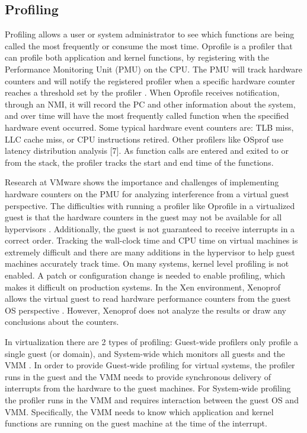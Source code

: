 \subsection{Profiling}
Profiling allows a user or system administrator to see which functions are being called the most frequently or consume the most time.  Oprofile \cite{levon} is a profiler that can profile both application and kernel functions, by registering with the Performance Monitoring Unit (PMU) on the CPU.  The PMU will track hardware counters and will notify the registered profiler when a specific hardware counter reaches a threshold set by the profiler \cite{mucci}.  When Oprofile receives notification, through an NMI, it will record the PC and other information about the system, and over time will have the most frequently called function when the specified hardware event occurred.  Some typical hardware event counters are:  TLB miss, LLC cache miss, or CPU instructions retired.   Other profilers like OSprof use latency distribution analysis [7].  As function calls are entered and exited to or from the stack, the profiler tracks the start and end time of the functions.

Research at VMware \cite{serebrin} shows the importance and challenges of implementing hardware counters on the PMU for analyzing interference from a virtual guest perspective.
The difficulties with running a profiler like Oprofile in a virtualized guest is that the hardware counters in the guest may not be available for all hypervisors \cite{buell1}.  Additionally, the guest is not guaranteed to receive interrupts in a correct order.   Tracking the wall-clock time and CPU time on virtual machines is extremely difficult and there are many additions in the hypervisor to help guest machines accurately track time.  On many systems, kernel level profiling is not enabled. A patch or configuration change is needed to enable profiling, which makes it difficult on production systems.
In the Xen environment, Xenoprof allows the virtual guest to read hardware performance counters from the guest OS perspective \cite{menon, du2}.  However, Xenoprof does not analyze the results or draw any conclusions about the counters.  

\indent In virtualization there are 2 types of profiling:  Guest-wide profilers only profile a single guest (or domain), and System-wide which monitors all guests and the VMM \cite{du1}.  In order to provide Guest-wide profiling for virtual systems, the profiler runs in the guest and the VMM needs to provide synchronous delivery of interrupts from the hardware to the guest machines.  For System-wide profiling the profiler runs in the VMM and requires interaction between the guest OS and VMM.  Specifically, the VMM needs to know which application and kernel functions are running on the guest machine at the time of the interrupt.

